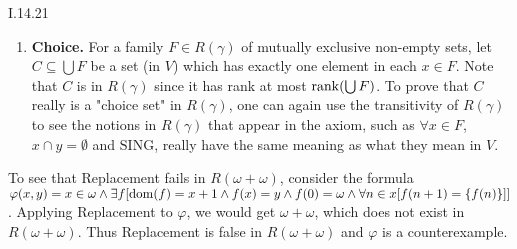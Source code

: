 \documentclass[12pt]{article}
\begin{document}
\begin{customthm}{I.14.21}
\begin{enumerate}
    \item\textbf{Choice.} For a family $F\in R(\gamma)$ of mutually exclusive non-empty sets, let $C\subseteq\bigcup F$ be a set (in $V$) which has exactly one element in each $x\in F$. Note that $C$ is in $R(\gamma)$ since it has rank at most $\mathop{\mathrm{rank}}(\bigcup F)$. To prove that $C$ really is a "choice set" in $R(\gamma)$, one can again use the transitivity of $R(\gamma)$ to see the notions in $R(\gamma)$ that appear in the axiom, such as $\forall x\in F$, $x\cap y=\emptyset$ and $\textrm{SING}$, really have the same meaning as what they mean in $V$.
  \end{enumerate}
  To see that Replacement fails in $R(\omega+\omega)$, consider the formula $\varphi(x,y)=x\in\omega\wedge\exists f[\mathop{\mathrm{dom}}(f)=x+1\wedge f(x)=y\wedge f(0)=\omega\wedge\forall n\in x[f(n+1)=\{f(n)\}]]$. Applying Replacement to $\varphi$, we would get $\omega+\omega$, which does not exist in $R(\omega+\omega)$. Thus Replacement is false in $R(\omega+\omega)$ and $\varphi$ is a counterexample.
\end{customthm}
\end{document}
